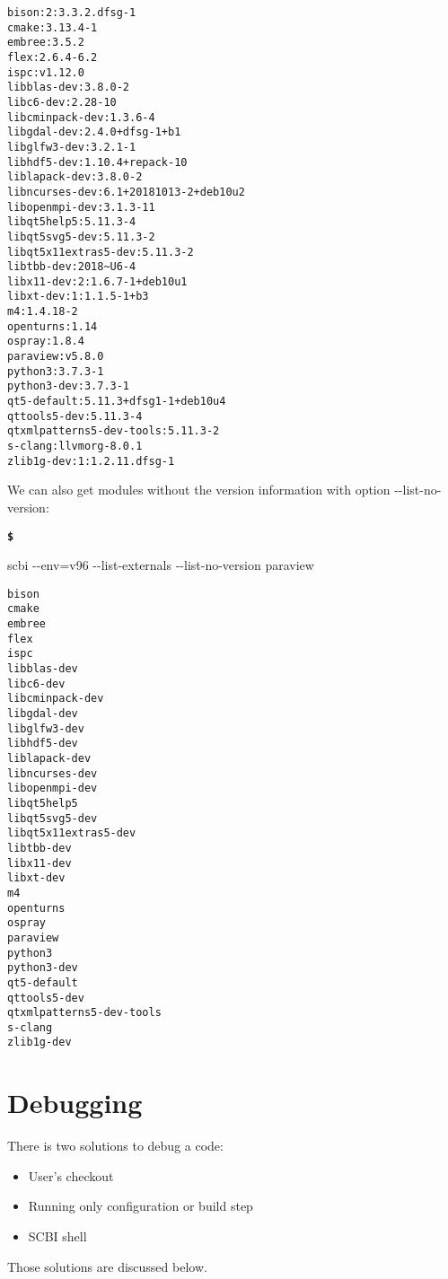 \documentclass[a4paper,12pt,twoside]{article}
\newenvironment{shellcommand}{
	\begin{list}{ %
			\bfseries\texttt \$
		}{ %
			\ttfamily
			\setlength{\topsep}{-0.3ex}
			\setlength{\labelwidth}{1in}
			\setlength{\leftmargin}{0.7in}
			\setlength{\labelsep}{0.5ex}
			\setlength{\rightmargin}{0.5in}
			\setlength{\itemsep}{1ex}
			\setlength{\parsep}{0ex}
			\setlength{\listparindent}{0.5in}
		}
	}{
	\end{list}
}
\newcommand{\ddash}{-{}-}
\let\stdsection\section
\renewcommand\section{\newpage\stdsection}
\begin{document}
\begin{lstlisting}
bison:2:3.3.2.dfsg-1
cmake:3.13.4-1
embree:3.5.2
flex:2.6.4-6.2
ispc:v1.12.0
libblas-dev:3.8.0-2
libc6-dev:2.28-10
libcminpack-dev:1.3.6-4
libgdal-dev:2.4.0+dfsg-1+b1
libglfw3-dev:3.2.1-1
libhdf5-dev:1.10.4+repack-10
liblapack-dev:3.8.0-2
libncurses-dev:6.1+20181013-2+deb10u2
libopenmpi-dev:3.1.3-11
libqt5help5:5.11.3-4
libqt5svg5-dev:5.11.3-2
libqt5x11extras5-dev:5.11.3-2
libtbb-dev:2018~U6-4
libx11-dev:2:1.6.7-1+deb10u1
libxt-dev:1:1.1.5-1+b3
m4:1.4.18-2
openturns:1.14
ospray:1.8.4
paraview:v5.8.0
python3:3.7.3-1
python3-dev:3.7.3-1
qt5-default:5.11.3+dfsg1-1+deb10u4
qttools5-dev:5.11.3-4
qtxmlpatterns5-dev-tools:5.11.3-2
s-clang:llvmorg-8.0.1
zlib1g-dev:1:1.2.11.dfsg-1
\end{lstlisting}

We can also get modules without the version information with option \ddash{}list-no-version:

\begin{shellcommand}
	\item scbi \ddash{}env=v96 \ddash{}list-externals \ddash{}list-no-version paraview
\end{shellcommand}

\begin{lstlisting}
bison
cmake
embree
flex
ispc
libblas-dev
libc6-dev
libcminpack-dev
libgdal-dev
libglfw3-dev
libhdf5-dev
liblapack-dev
libncurses-dev
libopenmpi-dev
libqt5help5
libqt5svg5-dev
libqt5x11extras5-dev
libtbb-dev
libx11-dev
libxt-dev
m4
openturns
ospray
paraview
python3
python3-dev
qt5-default
qttools5-dev
qtxmlpatterns5-dev-tools
s-clang
zlib1g-dev
\end{lstlisting}


\section{Debugging}
\label{debugging}

There is two solutions to debug a code:

\begin{itemize}
	\item User's checkout
	\item Running only configuration or build step
	\item SCBI shell
\end{itemize}

Those solutions are discussed below.
\end{document}
